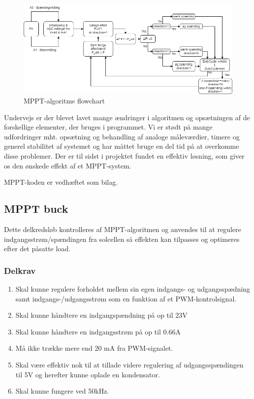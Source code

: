 \documentclass[../main.tex]{subfiles}
\begin{document}
\begin{figure}[H]
 \includegraphics[width=\textwidth]{Dokumentation/mpptflowchart.drawio (1).png}
  \caption{MPPT-algoritme flowchart}
  \label{fig: MPPT Flowchart}
  \end{figure}
Undervejs er der blevet lavet mange ændringer i algoritmen og opsætningen af de forskellige elementer, der bruges i programmet. Vi er stødt på mange udfordringer mht. opsætning og behandling af analoge måleværdier, timere og generel stabilitet af systemet og har måttet bruge en del tid på at overkomme disse problemer. Der er til sidst i projektet fundet en effektiv løsning, som giver os den ønskede effekt af et MPPT-system.

MPPT-koden er vedhæftet som bilag.


    \subsection{MPPT buck}
        Dette delkredsløb kontrolleres af MPPT-algoritmen og anvendes til at regulere indgangsstrøm/spændingen fra solcellen så effekten kan tilpasses og optimeres efter det påsatte load.
        
        \subsubsection{Delkrav}

            \begin{enumerate}
                \item Skal kunne regulere forholdet mellem sin egen indgangs- og udgangsspædning samt indgangs-/udgangsstrøm som en funktion af et PWM-kontrolsignal.
                \item Skal kunne håndtere en indgangspændning på op til 23V
                \item Skal kunne håndtere en indgangsstrøm på op til 0.66A
                \item Må ikke trække mere end 20 mA fra PWM-signalet.
                \item Skal være effektiv nok til at tillade videre regulering af udgangsspændingen til 5V og herefter kunne oplade en kondensator.
                \item Skal kunne fungere ved 50kHz.
            \end{enumerate}
            
\end{document}
